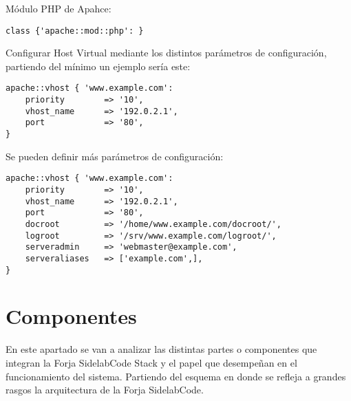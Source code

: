 \par Módulo PHP de Apahce:

\lstset{style=rubybasico}
\begin{lstlisting}[frame=trbl]
class {'apache::mod::php': }
\end{lstlisting}

\par Configurar Host Virtual mediante los distintos parámetros de configuración, partiendo del mínimo un ejemplo sería este:

\lstset{style=rubybasico}
\begin{lstlisting}[frame=trbl]
apache::vhost { 'www.example.com':
    priority        => '10',
    vhost_name      => '192.0.2.1',
    port            => '80',
}
\end{lstlisting}

\par Se pueden definir más parámetros de configuración:

\lstset{style=rubybasico}
\begin{lstlisting}[frame=trbl]
apache::vhost { 'www.example.com':
    priority        => '10',
    vhost_name      => '192.0.2.1',
    port            => '80',
    docroot         => '/home/www.example.com/docroot/',
    logroot         => '/srv/www.example.com/logroot/',
    serveradmin     => 'webmaster@example.com',
    serveraliases   => ['example.com',],
}
\end{lstlisting}



\section{Componentes}
\label{sec:componentes}

\begin{comment}
Componentes, ¿ aquí se definirían las herramientas a instalar ?

Efectivamente, qué herramientas instala la forja (Se supone que las has descrito en la parte de procesos de desarrollo de forma genérica, aquí se dan nombres concretos). 
\end{comment}

\par En este apartado se van a analizar las distintas partes o componentes que integran la Forja SidelabCode Stack y el papel que desempeñan en el funcionamiento del sistema. Partiendo del esquema en donde se refleja a grandes rasgos la arquitectura de la Forja SidelabCode.

